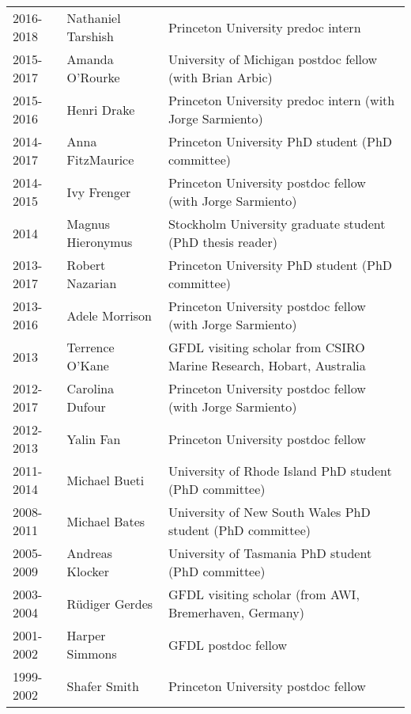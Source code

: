 \documentclass{article}
\begin{document}
\begin{tabular}{lll}
2016-2018 & Nathaniel Tarshish & Princeton University predoc intern \\

2015-2017 & Amanda O'Rourke  & University of Michigan postdoc fellow (with Brian Arbic) \\

2015-2016    & Henri Drake             & Princeton University predoc intern (with Jorge Sarmiento) \\

2014-2017 & Anna FitzMaurice   & Princeton University PhD student (PhD committee) \\ 

2014-2015     & Ivy Frenger            & Princeton University postdoc fellow (with Jorge Sarmiento) \\

2014 & Magnus Hieronymus& Stockholm University graduate student (PhD thesis reader) \\ 

2013-2017 & Robert Nazarian    & Princeton University PhD student (PhD committee) \\ 

2013-2016     & Adele Morrison     & Princeton University postdoc fellow (with Jorge Sarmiento) \\

2013               & Terrence O'Kane   & GFDL visiting scholar from CSIRO Marine Research, Hobart, Australia \\

2012-2017     & Carolina Dufour   & Princeton University postdoc fellow (with Jorge Sarmiento)  \\

2012-2013     & Yalin Fan              & Princeton University postdoc fellow  \\

2011-2014     & Michael Bueti       & University of Rhode Island  PhD student (PhD committee) \\

2008-2011     & Michael Bates       & University of New South Wales PhD student (PhD committee) \\

2005-2009     & Andreas Klocker   & University of Tasmania  PhD student (PhD committee) \\

2003-2004     & {R\"{u}diger} Gerdes  & GFDL visiting scholar (from AWI, Bremerhaven, Germany) \\

2001-2002     & Harper Simmons   & GFDL postdoc fellow \\

1999-2002     & Shafer Smith         & Princeton University postdoc fellow    
\end{tabular}
\end{document}
